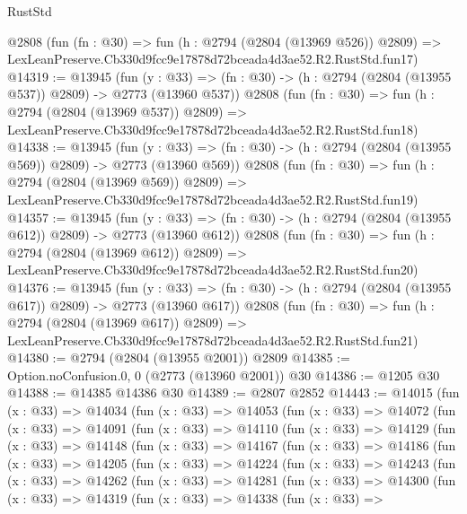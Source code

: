 \begin{lexlean}{RustStd}
\begin{coremodule}
    @2808
    (fun (fn : @30) =>
    fun (h : @2794 (@2804 (@13969 @526)) @2809) =>
    LexLeanPreserve.Cb330d9fcc9e17878d72bceada4d3ae52.R2.RustStd.fun17)
@14319 := @13945
    (fun (y : @33) => (fn : @30) -> (h : @2794 (@2804 (@13955 @537)) @2809) -> @2773 (@13960 @537))
    @2808
    (fun (fn : @30) =>
    fun (h : @2794 (@2804 (@13969 @537)) @2809) =>
    LexLeanPreserve.Cb330d9fcc9e17878d72bceada4d3ae52.R2.RustStd.fun18)
@14338 := @13945
    (fun (y : @33) => (fn : @30) -> (h : @2794 (@2804 (@13955 @569)) @2809) -> @2773 (@13960 @569))
    @2808
    (fun (fn : @30) =>
    fun (h : @2794 (@2804 (@13969 @569)) @2809) =>
    LexLeanPreserve.Cb330d9fcc9e17878d72bceada4d3ae52.R2.RustStd.fun19)
@14357 := @13945
    (fun (y : @33) => (fn : @30) -> (h : @2794 (@2804 (@13955 @612)) @2809) -> @2773 (@13960 @612))
    @2808
    (fun (fn : @30) =>
    fun (h : @2794 (@2804 (@13969 @612)) @2809) =>
    LexLeanPreserve.Cb330d9fcc9e17878d72bceada4d3ae52.R2.RustStd.fun20)
@14376 := @13945
    (fun (y : @33) => (fn : @30) -> (h : @2794 (@2804 (@13955 @617)) @2809) -> @2773 (@13960 @617))
    @2808
    (fun (fn : @30) =>
    fun (h : @2794 (@2804 (@13969 @617)) @2809) =>
    LexLeanPreserve.Cb330d9fcc9e17878d72bceada4d3ae52.R2.RustStd.fun21)
@14380 := @2794 (@2804 (@13955 @2001)) @2809
@14385 := Option.noConfusion.{0, 0} (@2773 (@13960 @2001)) @30
@14386 := @1205 @30
@14388 := @14385 @14386 @30
@14389 := @2807 @2852
@14443 := @14015
    (fun (x : @33) =>
    @14034
      (fun (x : @33) =>
      @14053
        (fun (x : @33) =>
        @14072
          (fun (x : @33) =>
          @14091
            (fun (x : @33) =>
            @14110
              (fun (x : @33) =>
              @14129
                (fun (x : @33) =>
                @14148
                  (fun (x : @33) =>
                  @14167
                    (fun (x : @33) =>
                    @14186
                      (fun (x : @33) =>
                      @14205
                        (fun (x : @33) =>
                        @14224
                          (fun (x : @33) =>
                          @14243
                            (fun (x : @33) =>
                            @14262
                              (fun (x : @33) =>
                              @14281
                                (fun (x : @33) =>
                                @14300
                                  (fun (x : @33) =>
                                  @14319
                                    (fun (x : @33) =>
                                    @14338
                                      (fun (x : @33) =>

\end{coremodule}
\end{lexlean}
